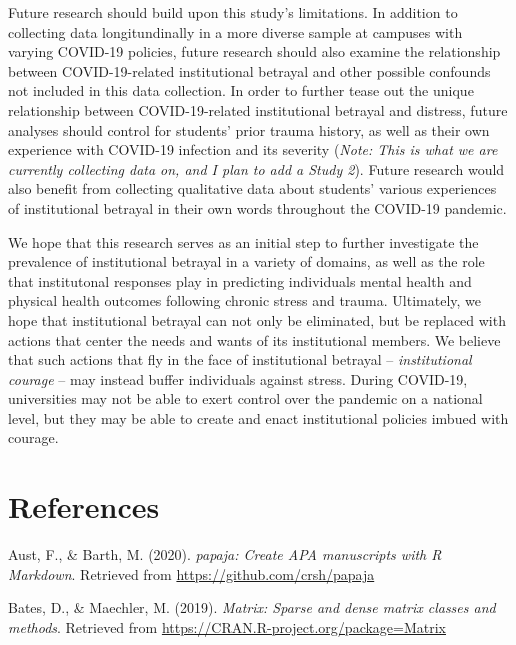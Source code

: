 \documentclass[
  english,
  man, noextraspace]{apa6}
\begin{document}
Future research should build upon this study's limitations. In addition to collecting data longitundinally in a more diverse sample at campuses with varying COVID-19 policies, future research should also examine the relationship between COVID-19-related institutional betrayal and other possible confounds not included in this data collection. In order to further tease out the unique relationship between COVID-19-related institutional betrayal and distress, future analyses should control for students' prior trauma history, as well as their own experience with COVID-19 infection and its severity (\emph{Note: This is what we are currently collecting data on, and I plan to add a Study 2}). Future research would also benefit from collecting qualitative data about students' various experiences of institutional betrayal in their own words throughout the COVID-19 pandemic.

We hope that this research serves as an initial step to further investigate the prevalence of institutional betrayal in a variety of domains, as well as the role that institutonal responses play in predicting individuals mental health and physical health outcomes following chronic stress and trauma. Ultimately, we hope that institutional betrayal can not only be eliminated, but be replaced with actions that center the needs and wants of its institutional members. We believe that such actions that fly in the face of institutional betrayal -- \emph{institutional courage} -- may instead buffer individuals against stress. During COVID-19, universities may not be able to exert control over the pandemic on a national level, but they may be able to create and enact institutional policies imbued with courage.

\newpage

\hypertarget{references}{%
\section{References}\label{references}}

\begingroup
\setlength{\parindent}{-0.5in}
\setlength{\leftskip}{0.5in}

\hypertarget{refs}{}
\leavevmode\hypertarget{ref-R-papaja}{}%
Aust, F., \& Barth, M. (2020). \emph{papaja: Create APA manuscripts with R Markdown}. Retrieved from \url{https://github.com/crsh/papaja}

\leavevmode\hypertarget{ref-R-Matrix}{}%
Bates, D., \& Maechler, M. (2019). \emph{Matrix: Sparse and dense matrix classes and methods}. Retrieved from \url{https://CRAN.R-project.org/package=Matrix}
\end{document}
